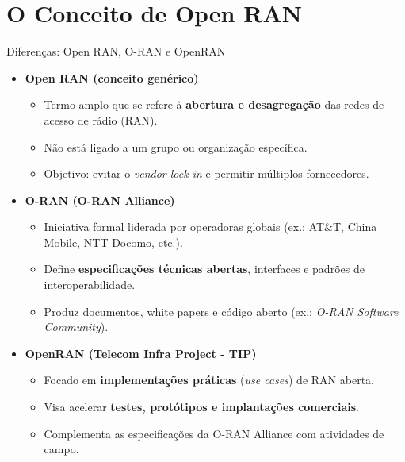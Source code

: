 
\section{O Conceito de Open RAN}

\begin{frame}{Diferenças: Open RAN, O-RAN e OpenRAN}
\begin{itemize}
  \item \textbf{Open RAN (conceito genérico)}  
    \begin{itemize}
      \item Termo amplo que se refere à \textbf{abertura e desagregação} das redes de acesso de rádio (RAN).  
      \item Não está ligado a um grupo ou organização específica.  
      \item Objetivo: evitar o \textit{vendor lock-in} e permitir múltiplos fornecedores.
    \end{itemize}

  \item \textbf{O-RAN (O-RAN Alliance)}  
    \begin{itemize}
      \item Iniciativa formal liderada por operadoras globais (ex.: AT\&T, China Mobile, NTT Docomo, etc.).  
      \item Define \textbf{especificações técnicas abertas}, interfaces e padrões de interoperabilidade.  
      \item Produz documentos, white papers e código aberto (ex.: \textit{O-RAN Software Community}).
    \end{itemize}

  \item \textbf{OpenRAN (Telecom Infra Project - TIP)}  
    \begin{itemize}
      \item Focado em \textbf{implementações práticas} (\textit{use cases}) de RAN aberta.  
      \item Visa acelerar \textbf{testes, protótipos e implantações comerciais}.  
      \item Complementa as especificações da O-RAN Alliance com atividades de campo.
    \end{itemize}
\end{itemize}
\end{frame}

